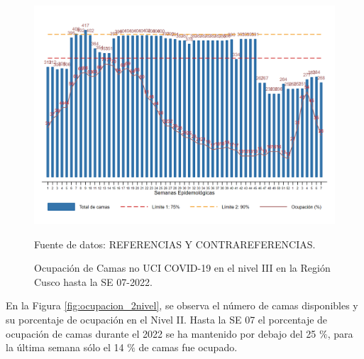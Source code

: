 \documentclass[12pt,a4paper,openany]{book}
\begin{document}
\begin{figure}[htpb]
	\caption{Ocupación de Camas no UCI COVID-19 en el nivel III en la Región Cusco hasta la SE 07-2022.}\label{fig:ocupacion_3_nivel}
	\begin{center}
		\includegraphics[width=0.95\linewidth]{../figuras/nivel_3.png}
	\end{center}
	{\footnotesize {Fuente de datos: REFERENCIAS Y CONTRAREFERENCIAS.}}
\end{figure}

\clearpage

En la Figura \ref{fig:ocupacion_2nivel}, se observa el número de camas disponibles y su porcentaje de ocupación en el Nivel II. Hasta la SE 07 el porcentaje de ocupación de camas durante el 2022 se ha mantenido por debajo del 25 $\%$, para la última semana sólo el 14 $\%$ de camas fue ocupado. 
\end{document}
